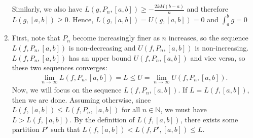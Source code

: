 \begin{enumerate}[label=\textbf{1A.\arabic*}]
    Similarly, we also have \( L(g, P_{n}, [a, b]) \ge - \frac{2kM(b-a)}{n} \)
    and therefore \( L(g, [a, b]) \ge 0 \). Hence, \( L(g, [a, b]) = U(g, [a,
    b]) = 0 \) and \( \int _{a}^{b} g = 0 \)
  \item \label{1A7} First, note that \( P_{n} \) become increasingly finer as \( n \)
  increases, so the sequence \( L(f, P_{n}, [a, b]) \) is 
  non-decreasing and \( U(f, P_{n}, [a, b]) \) is non-increasing. \( L(f, P_{n},
  [a, b]) \) has an upper bound \( U(f, P_{n}, [a, b]) \) and vice versa, so
  these two sequences converges:
  \begin{align*}
    \lim_{n \to \infty} L(f, P_{n}, [a, b]) = L \le U = \lim_{n \to \infty}
    U(f,  P_{n}, [a, b])
  .\end{align*}
  Now, we will focus on the sequence \( L(f, P_{n}, [a, b]) \). If \( L = L(f,
  [a, b]) \), then we are done. Assuming otherwise, since \( L(f, [a, b]) \le
  L(f, P_{n}, [a, b]) \) for all \( n \in \mathbb{N} \), we must have \( L >
  L(f, [a, b]) \). By the definition of \( L(f, [a, b]) \), there exists some
  partition \( P' \) such that \( L(f, [a, b]) < L(f, P', [a, b]) \le L \).


\end{enumerate}
